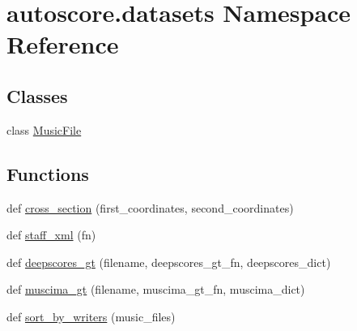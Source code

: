 \hypertarget{namespaceautoscore_1_1datasets}{}\section{autoscore.\+datasets Namespace Reference}
\label{namespaceautoscore_1_1datasets}
\subsection*{Classes}
\begin{DoxyCompactItemize}
\item 
class \hyperlink{classautoscore_1_1datasets_1_1MusicFile}{Music\+File}
\end{DoxyCompactItemize}
\subsection*{Functions}
\begin{DoxyCompactItemize}
\item 
def \hyperlink{namespaceautoscore_1_1datasets_a454e460a4592b3217d32e3fdf4a8a432}{cross\+\_\+section} (first\+\_\+coordinates, second\+\_\+coordinates)
\item 
def \hyperlink{namespaceautoscore_1_1datasets_a302ddb4002d8d7e62ea4451222bc3822}{staff\+\_\+xml} (fn)
\item 
def \hyperlink{namespaceautoscore_1_1datasets_a9195656f2ced7d26f448a44627606a52}{deepscores\+\_\+gt} (filename, deepscores\+\_\+gt\+\_\+fn, deepscores\+\_\+dict)
\item 
def \hyperlink{namespaceautoscore_1_1datasets_a34a53caff7c74831afe401b4164b1c91}{muscima\+\_\+gt} (filename, muscima\+\_\+gt\+\_\+fn, muscima\+\_\+dict)
\item 
def \hyperlink{namespaceautoscore_1_1datasets_a570d26006f6a64091bcf201d3f035508}{sort\+\_\+by\+\_\+writers} (music\+\_\+files)
\end{DoxyCompactItemize}
